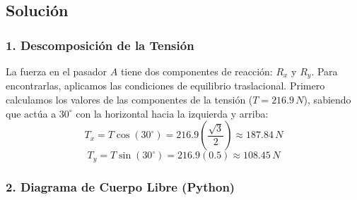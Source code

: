 \documentclass[12pt, a4paper]{article}
\begin{document}
\begin{center}
\end{center}

\subsection*{Solución}

\subsubsection*{1. Descomposición de la Tensión}
La fuerza en el pasador $A$ tiene dos componentes de reacción: $R_x$ y $R_y$. Para encontrarlas, aplicamos las condiciones de equilibrio traslacional. 
Primero calculamos los valores de las componentes de la tensión ($T = 216.9 \, \si{N}$), sabiendo que actúa a $30^\circ$ con la horizontal hacia la izquierda y arriba:
$$T_x = T \cos(30^\circ) = 216.9 \left( \frac{\sqrt{3}}{2} \right) \approx 187.84 \, \si{N}$$
$$T_y = T \sin(30^\circ) = 216.9 \left( 0.5 \right) \approx 108.45 \, \si{N}$$

\subsubsection*{2. Diagrama de Cuerpo Libre (Python)}
\end{document}
